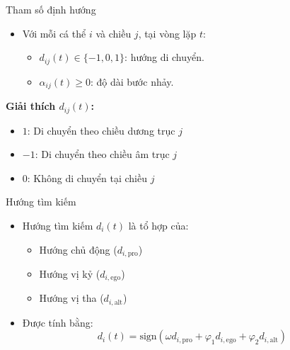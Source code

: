 \documentclass[10pt]{beamer}
\begin{document}
\begin{frame}{Tham số định hướng}
\begin{itemize}
    \item Với mỗi cá thể $i$ và chiều $j$, tại vòng lặp $t$:
    \begin{itemize}
        \item $d_{ij}(t) \in \{-1, 0, 1\}$: hướng di chuyển.
        \item $\alpha_{ij}(t) \geq 0$: độ dài bước nhảy.
    \end{itemize}
\end{itemize}

\vspace{1em}
\textbf{Giải thích $d_{ij}(t)$:}
\begin{itemize}
    \item $1$: Di chuyển theo chiều dương trục $j$
    \item $-1$: Di chuyển theo chiều âm trục $j$
    \item $0$: Không di chuyển tại chiều $j$
\end{itemize}
\end{frame}

\begin{frame}{Hướng tìm kiếm}
\begin{itemize}
    \item Hướng tìm kiếm $d_i(t)$ là tổ hợp của:
    \begin{itemize}
        \item Hướng chủ động ($d_{i,\text{pro}}$)
        \item Hướng vị kỷ ($d_{i,\text{ego}}$)
        \item Hướng vị tha ($d_{i,\text{alt}}$)
    \end{itemize}

    \item Được tính bằng:
    \[
    d_i(t) = \text{sign}(\omega d_{i,\text{pro}} + \varphi_1 d_{i,\text{ego}} + \varphi_2 d_{i,\text{alt}})
    \]
\end{itemize}
\end{frame}
\end{document}
